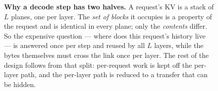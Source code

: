 \begin{figure}[t]
{}
\caption{\textbf{Why a decode step has two halves.} A request's KV is a stack of $L$
planes, one per layer. The \emph{set of blocks} it occupies is a property of the
request and is identical in every plane; only the \emph{contents} differ. So the
expensive question --- where does this request's history live --- is answered once
per step and reused by all $L$ layers, while the bytes themselves must cross the link
once per layer. The rest of the design follows from that split: per-request work is
kept off the per-layer path, and the per-layer path is reduced to a transfer that can
be hidden.}
\label{fig:step}
\end{figure}
